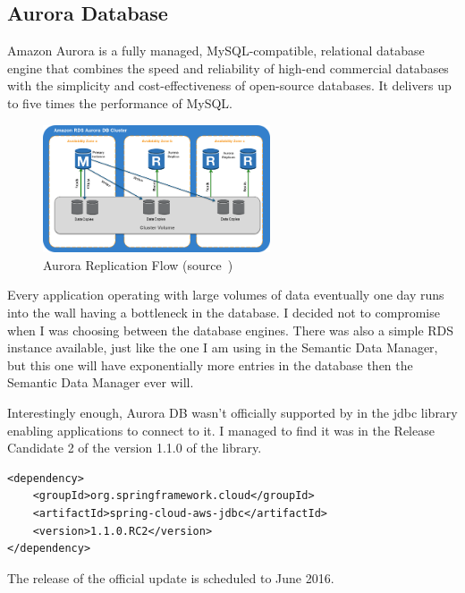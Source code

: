 \subsection{Aurora Database}

Amazon Aurora is a fully managed, MySQL-compatible, relational database engine that combines the speed and reliability of high-end commercial databases with the simplicity and cost-effectiveness of open-source databases. It delivers up to five times the performance of MySQL.

\begin{figure}[!ht]
	\centering
	\includegraphics[width=0.6\textwidth]{figures/04_implementation/aurora}
    \caption[Aurora Replication Flow]{Aurora Replication Flow (source~\protect\cite{aurora})}
\end{figure}

\newpage

Every application operating with large volumes of data eventually one day runs into the wall having a bottleneck in the database. I decided not to compromise when I was choosing between the database engines. There was also a simple RDS instance available, just like the one I am using in the Semantic Data Manager, but this one will have exponentially more entries in the database then the Semantic Data Manager ever will.

Interestingly enough, Aurora DB wasn't officially supported by in the jdbc library enabling applications to connect to it. I managed to find it was in the Release Candidate 2 of the version 1.1.0 of the library. 

\bigbreak

\begin{lstlisting}
<dependency>
	<groupId>org.springframework.cloud</groupId>
	<artifactId>spring-cloud-aws-jdbc</artifactId>
	<version>1.1.0.RC2</version>
</dependency>
\end{lstlisting}

\bigbreak

The release of the official update is scheduled to June 2016.

